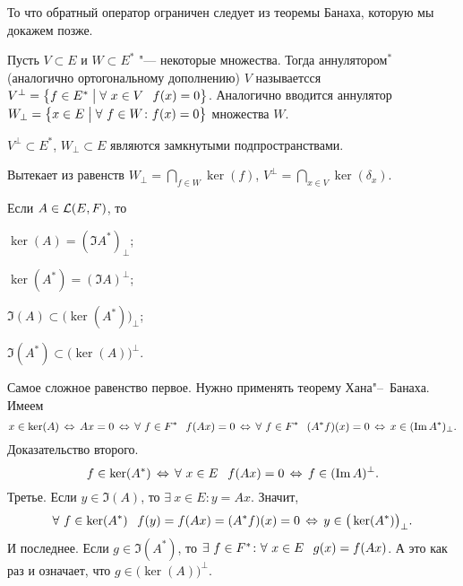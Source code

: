 То что обратный оператор ограничен следует из теоремы Банаха, которую мы докажем позже.
\begin{Def}
Пусть $V\subset E$ и $W\subset E^*$ "--- некоторые множества. Тогда аннулятором${}^*$ (аналогично ортогональному дополнению) $V$ называетсся $V^\perp = \big\{f\in E^*\bigm|\forall\ x\in V\pau f(x)=0\big\}$. Аналогично вводится аннулятор $W_\perp = \big\{x\in E\bigm|\forall\ f\in W\colon f(x)=0\big\}$ множества $W$.
\end{Def}
\begin{Lem}
  $V^\perp\subset E^*$, $W_\perp\subset E$ являются замкнутыми подпространствами.
\end{Lem}
\begin{Proof}
  Вытекает из равенств $W_\perp = \bigcap\limits_{f\in W}\ker(f)$, $V^\perp = \bigcap\limits_{x\in V}\ker(\delta_x)$.
\end{Proof}
\begin{The}\label{AnuSub}
  Если $A\in \mathcal L(E,F)$, то
\begin{roItems}
\item  $\ker(A) = (\Im A^*)_\perp$;
\item $\ker(A^*) = (\Im A)^\perp$;
\item $\Im(A)\subset \big(\ker(A^*)\big)_\perp$;
\item $\Im(A^*)\subset \big(\ker(A)\big)^\perp$.
\end{roItems}
\end{The}
\begin{Proof}
  Самое сложное равенство первое. Нужно применять теорему Хана"--~Банаха. Имеем
\[
  x\in\ker(A)\,\Leftrightarrow\, Ax=0\,\Leftrightarrow\, \forall\ f\in F^*\hskip .75em plus.1em minus.08em\relax f(Ax) = 0
  \,\Leftrightarrow\, \forall\ f\in F^*\hskip .75em plus.1em minus.08em\relax (A^*f)(x) = 0\,\Leftrightarrow\, x\in (\mathop{\mathrm{Im}} A^*)_\perp.
\]
Доказательство второго.
\[
  f\in\ker(A^*)\,\Leftrightarrow\, \forall\ x\in E\hskip .75em plus.1em minus.08em\relax f(Ax) = 0 \,\Leftrightarrow\,
  f\in (\mathop{\mathrm{Im}} A)^\perp.
\]
Третье. Если $y\in\Im(A)$, то $\exists\ x\in E\colon y=Ax$. Значит, 
\[
  \forall\ f\in \ker(A^*)\hskip .75em plus.1em minus.08em\relax f(y) = f(Ax) = (A^*f)(x) = 0 \,\Leftrightarrow\, y\in \big(\ker(A^*)\big)_\perp.
\]
И последнее. Если $g\in \Im(A^*)$, то $\exists\ f\in F^*\colon \forall\ x\in E\pau g(x) = f(Ax)$. А это как раз и означает, что $g\in \big(\ker(A)\big)^\perp$.
\end{Proof}

